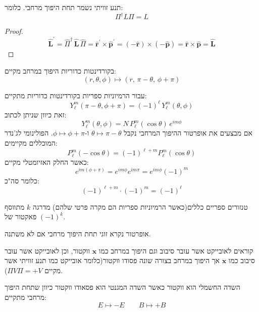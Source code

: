 \documentclass{tstextbook}
\begin{document}
\begin{proposition}
תנע זוויתי נשמר תחת היפוך מרחבי. כלומר:
$$\Pi ^{\dagger}L\Pi=L$$

\end{proposition}
\begin{proof}
$$\hat{\mathbf{L}}^{\prime}=\hat{\Pi}^{\dagger}\,\hat{\mathbf{L}}\,\hat{\Pi}=\hat{\mathbf{r}}^{\prime}\times\hat{\mathbf{p}}^{\prime}=\left(-\hat{\mathbf{r}}\right)\times\left(-\hat{\mathbf{p}}\right)=\hat{\mathbf{r}}\times\hat{\mathbf{p}}=\hat{\mathbf{L}}$$

\end{proof}
\begin{proposition}
בקורדינטות כדוריות היפוך במרחב מקיים:
$$\left( r,\theta,\phi \right)\mapsto\left( r,\,\pi-\theta,\,\phi+\pi \right)$$

\end{proposition}
\begin{example}
עבור הרמיוניות ספריות בקורדינטות כדוריות מתקיים:
$$Y_{\ell}^{m}(\pi-\theta,\phi+\pi)=(-1)^{\ell}\,Y_{\ell}^{m}(\theta,\phi)$$
זאת כיוון שניתן לכתוב:
$$Y_{\ell}^{m}(\theta,\phi)=N\,P_{\ell}^{m}(\cos\theta)\,e^{i m\phi}$$
אם מבצעים את אופרטור ההיפוך המרחבי נקבל \(\theta \mapsto \pi-\theta\) ו-\(\phi \mapsto \phi+\pi\). הפולינומי לג'נדר המוכללים מקיימים:
$$P_{\ell}^{m}(-\cos\theta)=(-1)^{\ell+m}P_{\ell}^{m}(\cos\theta)$$
כאשר החלק האזיומטלי מקיים:
$$e^{i m(\phi+\pi)}=e^{i m\phi}e^{i m\pi}=e^{i m\phi}(-1)^{m}$$
כלומר סה"כ:
$$(-1)^{\ell+m}\cdot(-1)^{m}=(-1)^{\ell}$$

\end{example}
\begin{remark}
טנזורים ספריים כללים(כאשר הרמיוניות ספריות הם מקרה פרטי שלהם) מדרגה \(k\) מתווסף פאקטור של \((-1)^{k}\).

\end{remark}
\begin{definition}
אופרטור נקרא זוגי תחת היפוך מרחבי אם לא משתנה. 

\end{definition}
\begin{remark}
קוראים לאובייקט אשר עובר סיבוב וגם היפוך במרחב כמו \(\mathbf{x}\) ווקטור, וכן לאובייקט אשר עובר סיבוב כמו \(\mathbf{x}\) אך היפוך במרחב בצורה שונה פסודו ווקטור(כלומר אובייקט כמו תנע זוויתי אשר מקיים \(\Pi V\Pi=+V\)).

\end{remark}
\begin{example}
השדה החשמלי הוא ווקטור כאשר השדה המגנטי הוא פסאודו ווקטור כיוון שתחת היפוך מרחבי מתקיים:
$$E\mapsto -E\qquad B\mapsto +B$$

\end{example}
\end{document}
